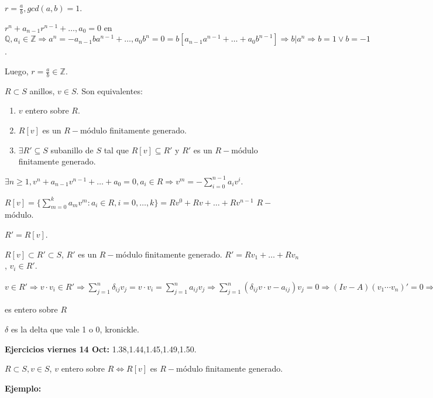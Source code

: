 $r=\frac{a}{b}, gcd(a,b)=1$.

$r^n+a_{n-1}r^{n-1}+\dots,a_0=0$ en $\mathbb{Q}, a_i\in \mathbb{Z} \Rightarrow a^n=-a_{n-1}ba^{n-1}+\dots,a_0b^n=0=b[a_{n-1}a^{n-1}+\dots+a_0b^{n-1}]\Rightarrow b|a^n \Rightarrow b=1 \vee b=-1$.

Luego, $r=\frac{a}{b} \in \mathbb{Z}$.

\begin{Prop}
$R\subset S$ anillos, $v\in S$. Son equivalentes: 
\begin{enumerate}
\item $v$ entero sobre $R$.
\item $R[v]$ es un $R-$módulo finitamente generado.
\item $\exists R'\subseteq S$ subanillo de $S$ tal que $R[v]\subseteq R'$ y $R'$ es un $R-$módulo finitamente generado.
\end{enumerate}
\end{Prop}

\begin{Dem}
 $\exists n\ge 1, v^n+a_{n-1}v^{n-1}+\dots+a_0=0, a_i\in R \Rightarrow v^m=-\sum_{i=0}^{n-1}a_iv^i$.

$R[v]=\{ \sum_{m=0}^k a_mv^m: a_i\in R,i=0,\dots, k\}=Rv^0+Rv+\dots+Rv^{n-1}$ $R-$módulo.

 $R'=R[v]$.

 $R[v]\subset R' \subset S$, $R'$ es un $R-$módulo finitamente generado. $R'=Rv_1+\dots+Rv_n$, $v_i\in R'$.

$v\in R'\Rightarrow v\cdot v_i\in R' \Rightarrow \sum_{j=1}^n \delta_{ij}v_j= v\cdot v_i=\sum_{j=1}^n a_{ij}v_j \Rightarrow \sum_{j=1}^n(\delta_{ij}v\cdot v-a_{ij})v_j=0 \Rightarrow (Iv-A) (v_1\cdots v_n)'=0 \Rightarrow \underbrace{det(IV-A)}_{\in R[v]\subset R}(v_1\cdots v_n)'=\vec{0} \Rightarrow_{I_{R'}=\sum b_iv_i} det(IV-A)=0 \Rightarrow v$ es entero sobre $R$

\end{Dem}

\begin{nota}
$\delta$ es la delta que vale 1 o 0, kronickle.
\end{nota}

\textbf{Ejercicios viernes 14 Oct:} 1.38,1.44,1.45,1.49,1.50.

$R\subset S, v\in S$, $v$ entero sobre $R \Leftrightarrow R[v]$ es $R-$módulo finitamente generado.

\textbf{Ejemplo: }

